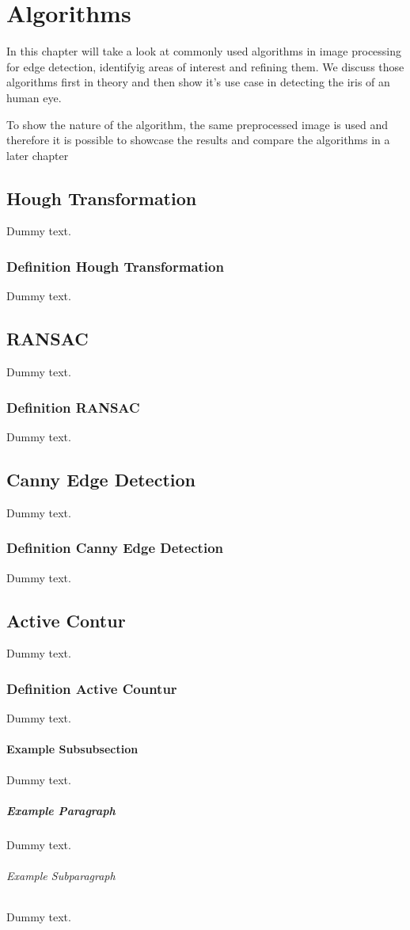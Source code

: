 \chapter{Algorithms}

In this chapter will take a look at commonly used algorithms in image processing for edge detection, identifyig areas of interest and refining them. 
We discuss those algorithms first in theory and then show it's use case in detecting the iris of an human eye. 

To show the nature of the algorithm, the same preprocessed image is used and therefore it is possible to showcase the results and compare the algorithms in a later chapter
\section{Hough Transformation}

Dummy text.

\subsection{Definition Hough Transformation }

Dummy text.

\section{RANSAC}

Dummy text.

\subsection{Definition RANSAC}

Dummy text.


\section{Canny Edge Detection}

Dummy text.

\subsection{Definition Canny Edge Detection}

Dummy text.

\section{Active Contur}

Dummy text.

\subsection{Definition Active Countur}

Dummy text.

\subsubsection{Example Subsubsection}

Dummy text.

\paragraph{Example Paragraph}

Dummy text.

\subparagraph{Example Subparagraph}

Dummy text.
